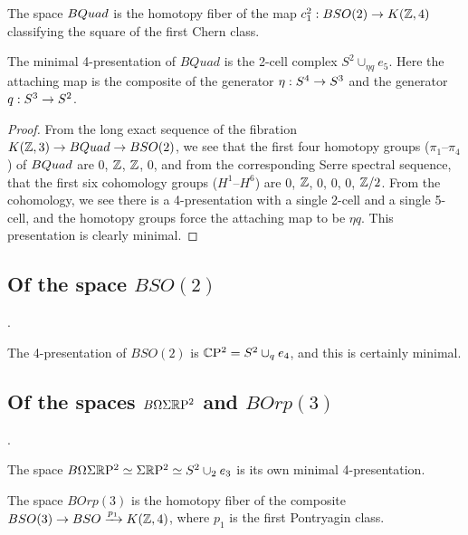 \documentclass{amsart}
\begin{document}
\begin{definition}[$BQuad$]
The space $BQuad$ is the homotopy fiber of the map $c_1^2: BSO(2) \rightarrow K(\mathbb Z,4)$ classifying the square of the first Chern class.
\end{definition}


\begin{proposition} 
\label{prop-quadtrunc}
The minimal 4-presentation of $BQuad$ is the 2-cell complex $S^2 \cup_{\eta q} e_5$.  Here the attaching map is the composite of the generator $\eta: S^4 \rightarrow S^3$ and the generator $q: S^3 \rightarrow S^2$.
\end{proposition}

\begin{proof}
From the long exact sequence of the fibration $K(\mathbb Z,3) \rightarrow BQuad \rightarrow BSO(2)$, we see that the first four homotopy groups ($\pi_1$--$\pi_4$) of $BQuad$ are $0$, $\mathbb Z$, $\mathbb Z$, $0$, and from the corresponding Serre spectral sequence, that the first six cohomology groups ($H^1$--$H^6$) are $0$, $\mathbb Z$, $0$, $0$, $0$, $\mathbb Z/2$.  From the cohomology, we see there is a 4-presentation with a single 2-cell and a single 5-cell, and the homotopy groups force the attaching map to be $\eta q$.  This presentation is clearly minimal.
\end{proof}

\subsection{Of the space $BSO(2)$}.

The 4-presentation of $BSO(2)$ is $\mathbb C \mathrm{P}^2 = S^2 \cup_q e_4$, and this is certainly minimal.

\subsection{Of the spaces $B \Omega \Sigma \mathbb R \mathrm{P}^2$ and $B Orp(3)$}.

The space $B \Omega \Sigma \mathbb R \mathrm{P}^2 \simeq \Sigma \mathbb R \mathrm{P}^2 \simeq S^2 \cup_2 e_3$ is its own minimal 4-presentation.

\begin{definition}[$BOrp(3)$]
The space $BOrp(3)$ is the homotopy fiber of the composite $BSO(3) \rightarrow BSO \xrightarrow{p_1} K(\mathbb Z,4)$, where $p_1$ is the first Pontryagin class.
\end{definition}
\end{document}
